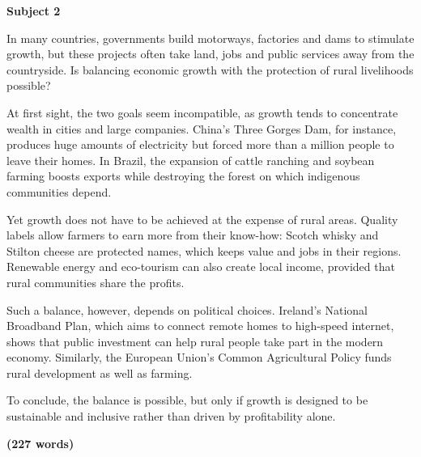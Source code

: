 \documentclass[11pt,a4paper]{article}
\begin{document}
\textbf{Subject 2}

In many countries, governments build motorways, factories and dams to stimulate growth, but these projects often take land, jobs and public services away from the countryside. Is balancing economic growth with the protection of rural livelihoods possible?

At first sight, the two goals seem incompatible, as growth tends to concentrate wealth in cities and large companies. China's Three Gorges Dam, for instance, produces huge amounts of electricity but forced more than a million people to leave their homes. In Brazil, the expansion of cattle ranching and soybean farming boosts exports while destroying the forest on which indigenous communities depend.

Yet growth does not have to be achieved at the expense of rural areas. Quality labels allow farmers to earn more from their know-how: Scotch whisky and Stilton cheese are protected names, which keeps value and jobs in their regions. Renewable energy and eco-tourism can also create local income, provided that rural communities share the profits.

Such a balance, however, depends on political choices. Ireland's National Broadband Plan, which aims to connect remote homes to high-speed internet, shows that public investment can help rural people take part in the modern economy. Similarly, the European Union's Common Agricultural Policy funds rural development as well as farming.

To conclude, the balance is possible, but only if growth is designed to be sustainable and inclusive rather than driven by profitability alone.

\textbf{(227 words)}
\end{document}
